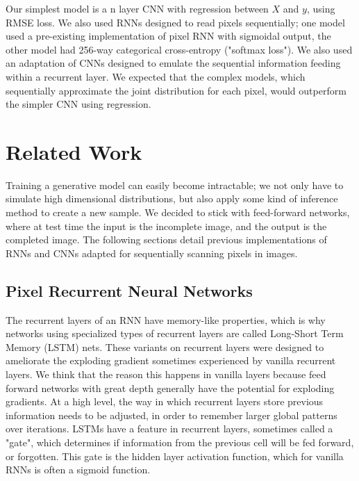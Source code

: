 \documentclass[10pt,twocolumn,letterpaper]{article}
\begin{document}
Our simplest model is a n layer CNN with regression between $X$ and $y$, using RMSE loss. We also used RNNs designed to read pixels sequentially; one model used a pre-existing implementation of pixel RNN with sigmoidal output, the other model had 256-way categorical cross-entropy ("softmax loss"). We also used an adaptation of CNNs designed to emulate the sequential information feeding within a recurrent layer. We expected that the complex models, which sequentially approximate the joint distribution for each pixel, would outperform the simpler CNN using regression.

\section{Related Work} 
Training a generative model can easily become intractable; we not only have to simulate high dimensional distributions, but also apply some kind of inference method to create a new sample. We decided to stick with feed-forward networks, where at test time the input is the incomplete image, and the output is the completed image. The following sections detail previous implementations of RNNs and CNNs adapted for sequentially scanning pixels in images.

\subsection{Pixel Recurrent Neural Networks}
The recurrent layers of an RNN have memory-like properties, which is why networks using specialized types of recurrent layers are called Long-Short Term Memory (LSTM) nets. These variants on recurrent layers were designed to ameliorate the exploding gradient sometimes experienced by vanilla recurrent layers. We think that the reason this happens in vanilla layers because feed forward networks with great depth generally have the potential for exploding gradients. At a high level, the way in which recurrent layers store previous information needs to be adjusted, in order to remember larger global patterns over iterations. LSTMs have a feature in recurrent layers, sometimes called a "gate", which determines if information from the previous cell will be fed forward, or forgotten. This gate is the hidden layer activation function, which for vanilla RNNs is often a sigmoid function. \cite{handwritingRNN}
\end{document}
